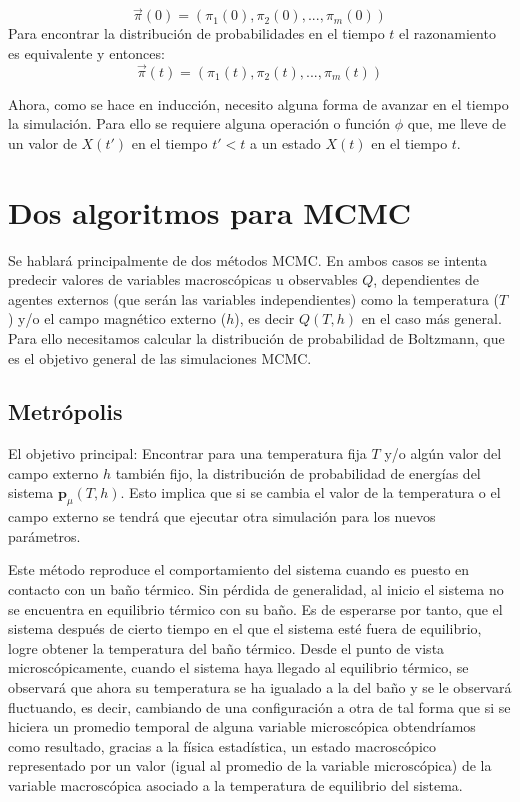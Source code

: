\documentclass[12pt]{book}
\begin{document}
\begin{equation}
	\vec{\pi}(0) = \left( \pi_{1}(0), \pi_{2}(0),..., \pi_{m}(0)\right)
\end{equation}
Para encontrar la distribución de probabilidades en el tiempo $t$ el razonamiento es equivalente y entonces:
\begin{equation}
	\vec{\pi}(t) = \left( \pi_{1}(t), \pi_{2}(t),..., \pi_{m}(t)\right)
\end{equation}

Ahora, como se hace en inducción, necesito alguna forma de avanzar en el tiempo la simulación. Para ello se requiere alguna operación o función $\phi$ que, me lleve de un valor de $X(t')$ en el tiempo $t' < t$ a un estado $X(t)$ en el tiempo $t$.
\\
\section{Dos algoritmos para MCMC}
Se hablará principalmente de dos métodos MCMC. En ambos casos se intenta predecir valores de variables macroscópicas u observables $Q$, dependientes de agentes externos (que serán las variables independientes) como la temperatura ($T$) y/o el campo magnético externo ($h$), es decir $Q(T, h)$ en el caso más general. Para ello necesitamos calcular la distribución de probabilidad de Boltzmann, que es el objetivo general de las simulaciones MCMC.
\subsection{Metrópolis}
El objetivo principal: Encontrar para una temperatura fija $T$ y/o algún valor del campo externo $h$ también fijo, la distribución de probabilidad de energías del sistema $\textbf{p}_{\mu}(T,h)$. Esto implica que si se cambia el valor de la temperatura o el campo externo se tendrá que ejecutar otra simulación para los nuevos parámetros.

Este método reproduce el comportamiento del sistema cuando es puesto en contacto con un baño térmico. Sin pérdida de generalidad, al inicio el sistema no se encuentra en equilibrio térmico con su baño. Es de esperarse por tanto, que el sistema después de cierto tiempo en el que el sistema esté fuera de equilibrio, logre obtener la temperatura del baño térmico. Desde el punto de vista microscópicamente, cuando el sistema haya llegado al equilibrio térmico, se observará que ahora su temperatura se ha igualado a la del baño y se  le observará fluctuando, es decir, cambiando de una configuración a otra de tal forma que si se hiciera un promedio temporal de alguna variable microscópica obtendríamos como resultado, gracias a la física estadística, un estado macroscópico representado por un valor (igual al promedio de la variable microscópica) de la variable macroscópica asociado a la temperatura de equilibrio del sistema. 
\end{document}
